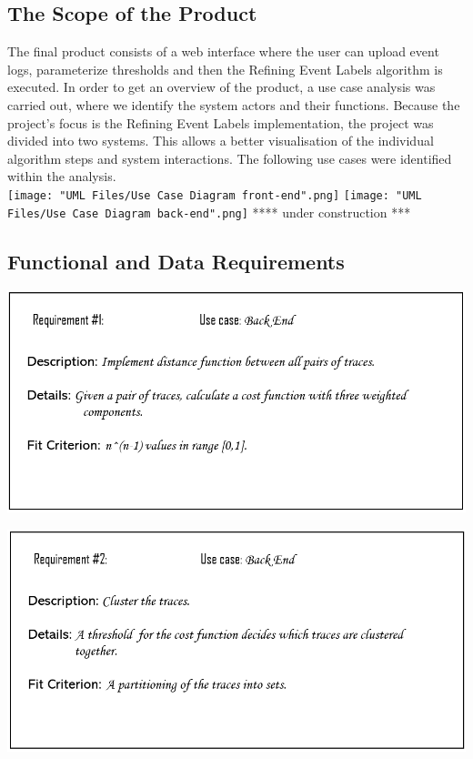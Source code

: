\documentclass[notitlepage]{article}
\begin{document}
\begin{flushleft}
\subsection{The Scope of the Product}
The final product consists of a web interface where the user can upload event logs, parameterize thresholds and then the Refining Event Labels algorithm is executed. 
In order to get an overview of the product, a use case analysis was carried out, where we identify the system actors and their functions. 
Because the project's focus is the Refining Event Labels implementation, the project was divided into two systems. 
This allows a better visualisation of the individual algorithm steps and system interactions. The following use cases were identified within the analysis.\\
\medskip
\texttt{[image: "UML Files/Use Case Diagram front-end".png]}
\medskip
\texttt{[image: "UML Files/Use Case Diagram back-end".png]}
{\color{gray} **** under construction ***}
\medskip
\subsection{Functional and Data Requirements}

\includegraphics[scale=0.6]{Req1.png}

\includegraphics[scale=0.6]{Req2.png}


\end{flushleft}
\end{document}
